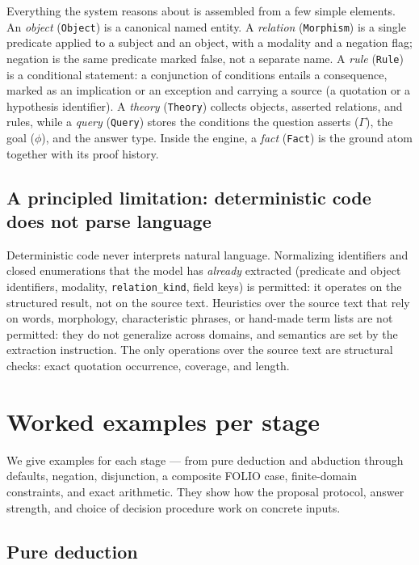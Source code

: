 \documentclass[11pt,a4paper]{article}
\begin{document}
Everything the system reasons about is assembled from a few simple elements. An
\emph{object} (\texttt{Object}) is a canonical named entity. A \emph{relation}
(\texttt{Morphism}) is a single predicate applied to a subject and an object, with a
modality and a negation flag; negation is the same predicate marked false, not a separate
name. A \emph{rule} (\texttt{Rule}) is a conditional statement: a conjunction of conditions
entails a consequence, marked as an implication or an exception and carrying a source (a
quotation or a hypothesis identifier). A \emph{theory} (\texttt{Theory}) collects objects,
asserted relations, and rules, while a \emph{query} (\texttt{Query}) stores the conditions
the question asserts ($\Gamma$), the goal ($\phi$), and the answer type. Inside the engine,
a \emph{fact} (\texttt{Fact}) is the ground atom together with its proof history.

\subsection{A principled limitation: deterministic code does not parse language}

Deterministic code never interprets natural language. Normalizing identifiers and closed
enumerations that the model has \emph{already} extracted (predicate and object identifiers,
modality, \texttt{relation\_kind}, field keys) is permitted: it operates on the structured
result, not on the source text. Heuristics over the source text that rely on words,
morphology, characteristic phrases, or hand-made term lists are not permitted: they do not
generalize across domains, and semantics are set by the extraction instruction. The only
operations over the source text are structural checks: exact quotation occurrence, coverage,
and length.

\section{Worked examples per stage}
\label{sec:example}

We give examples for each stage --- from pure deduction and abduction through defaults,
negation, disjunction, a composite FOLIO case, finite-domain constraints, and exact
arithmetic. They show how the proposal protocol, answer strength, and choice of decision
procedure work on concrete inputs.

\subsection{Pure deduction}
\end{document}
